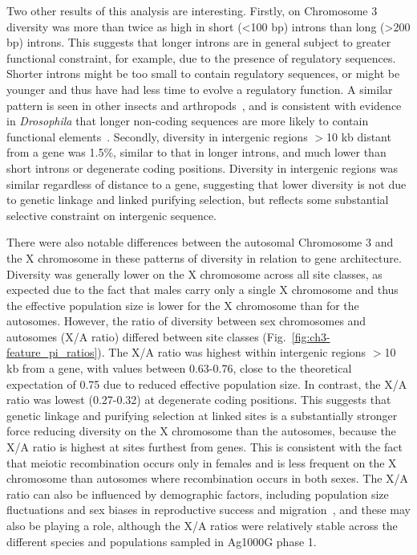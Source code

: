 \begin{refsection}
Two other results of this analysis are interesting.
%
Firstly, on Chromosome 3 diversity was more than twice as high in short (<100 bp) introns than long (>200 bp) introns.
%
This suggests that longer introns are in general subject to greater functional constraint, for example, due to the presence of regulatory sequences.
%
Shorter introns might be too small to contain regulatory sequences, or might be younger and thus have had less time to evolve a regulatory function.
%
A similar pattern is seen in other insects and arthropods~\parencite{Singh2013,Martin2016,Lynch2016}, and is consistent with evidence in
\textit{Drosophila} that longer non-coding sequences are more likely to contain functional elements~\parencite{Casillas2007}.
%
Secondly, diversity in intergenic regions $>$10 kb distant from a gene was 1.5\%, similar to that in longer introns, and much lower than short introns or degenerate coding positions.
%
Diversity in intergenic regions was similar regardless of distance to a gene, suggesting that lower diversity is not due to genetic linkage and linked purifying selection, but reflects some substantial selective constraint on intergenic sequence.


There were also notable differences between the autosomal Chromosome 3 and the X chromosome in these patterns of diversity in relation to gene architecture.
%
Diversity was generally lower on the X chromosome across all site classes, as expected due to the fact that males carry only a single X chromosome and thus the effective population size is lower for the X chromosome than for the autosomes.
%
However, the ratio of diversity between sex chromosomes and autosomes (X/A ratio) differed between site classes (Fig.~\ref{fig:ch3-feature_pi_ratios}).
%
The X/A ratio was highest within intergenic regions $>$10 kb from a gene, with values between 0.63-0.76, close to the theoretical expectation of 0.75 due to reduced effective population size.
%
In contrast, the X/A ratio was lowest (0.27-0.32) at degenerate coding positions.
%
This suggests that genetic linkage and purifying selection at linked sites is a substantially stronger force reducing diversity on the X chromosome than the autosomes, because the X/A ratio is highest at sites furthest from genes.
%
This is consistent with the fact that meiotic recombination occurs only in females and is less frequent on the X chromosome than autosomes where recombination occurs in both sexes.
%
The X/A ratio can also be influenced by demographic factors, including population size fluctuations and sex biases in reproductive success and migration~\parencite{CorbettDetig2015,Webster2016,Pool2007,Charlesworth2012b}, and these may also be playing a role, although the X/A ratios were relatively stable across the different species and populations sampled in Ag1000G phase 1.
%




\end{refsection}
